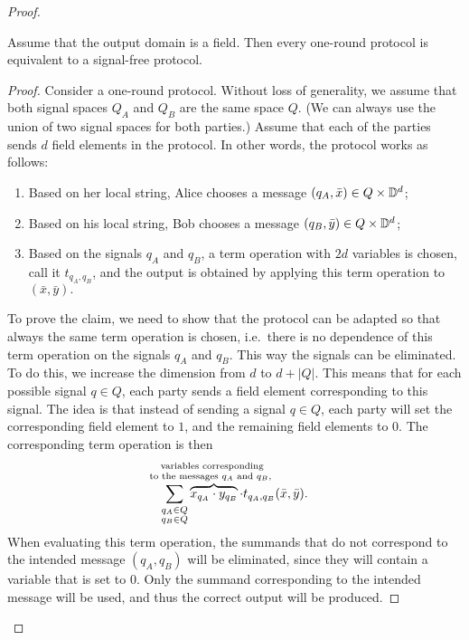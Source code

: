 \begin{proof}
 \begin{claim}
    \label{claim:trivial-messages}
    Assume that the output domain is a field. Then every one-round protocol is equivalent to a signal-free  protocol.
 \end{claim}
 \begin{proof} 
    Consider a one-round protocol. Without loss of generality, we assume that both signal spaces $Q_A$ and $Q_B$ are the same space $Q$. (We can always use the union of two signal spaces for both parties.) Assume that each of the parties sends $d$ field elements in the protocol. In other words, the protocol works as follows:
    \begin{enumerate}
        \item Based on her local string, Alice chooses a message $(q_A,\bar x) \in Q \times \mathbb D^d$;
        \item Based on his local string, Bob chooses a message $(q_B,\bar y) \in Q \times \mathbb D^d$;
        \item Based on the signals $q_A$ and $q_B$, a term operation  with $2d$ variables is chosen, call it $t_{q_A,q_B}$, and the output is obtained by applying this term operation to $(\bar x, \bar y).$
    \end{enumerate}
    To prove the claim, we need to show that the protocol can be adapted so that always the same term operation is chosen, i.e.~there is no dependence of this term operation on the signals $q_A$ and $q_B$. This way the signals can be eliminated. To do this, we increase the dimension from $d$ to $d + |Q|$. 
    This means that for each possible signal $q \in Q$, each party sends a field element corresponding to this signal. The idea is that instead of sending a signal $q \in Q$, each party will set the corresponding field element to $1$, and the remaining field elements to $0$. The corresponding term operation is then 
    \begin{align*}
    \sum_{\substack{q_A \in Q \\ q_B \in Q}} \myoverbrace{x_{q_A} \cdot y_{q_B}}{variables corresponding \\ to the messages $q_A$ and $q_B$, } \cdot t_{q_A,q_B}(\bar x, \bar y).
    \end{align*}
    When evaluating this term operation, the summands that do not correspond to the intended message $(q_A,q_B)$ will be eliminated, since they will contain a variable that is set to $0$. Only the summand corresponding to the intended message will be used, and thus the correct output will be produced. 
 \end{proof}


\end{proof}

